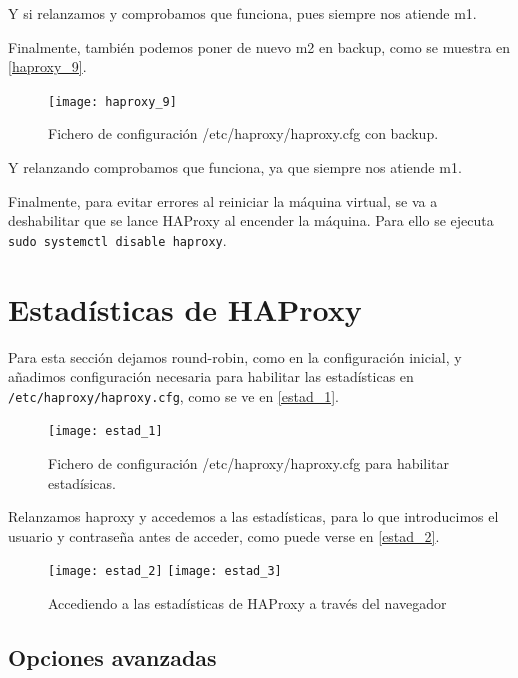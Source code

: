 Y si relanzamos y comprobamos que funciona, pues siempre nos atiende m1.

Finalmente, también podemos poner de nuevo m2 en backup, como se muestra en \eqref{haproxy_9}.

\begin{figure}[h!]
\begin{center}
\caption{Fichero de configuración /etc/haproxy/haproxy.cfg con backup.}
\label{haproxy_9}
\texttt{[image: haproxy\_9]}
\end{center}
\end{figure}

Y relanzando comprobamos que funciona, ya que siempre nos atiende m1.

Finalmente, para evitar errores al reiniciar la máquina virtual, se va a deshabilitar que se lance HAProxy al encender la máquina. Para ello se ejecuta \verb|sudo systemctl disable haproxy|.

\chapter{Estadísticas de HAProxy}

Para esta sección dejamos round-robin, como en la configuración inicial, y añadimos configuración necesaria para habilitar las estadísticas en \verb|/etc/haproxy/haproxy.cfg|, como se ve en \eqref{estad_1}.

\begin{figure}[h!]
\begin{center}
\caption{Fichero de configuración /etc/haproxy/haproxy.cfg para habilitar estadísicas.}
\label{estad_1}
\texttt{[image: estad\_1]}
\end{center}
\end{figure}

Relanzamos haproxy y accedemos a las estadísticas, para lo que introducimos el usuario y contraseña antes de acceder, como puede verse en \eqref{estad_2}.

\begin{figure}[h!]
\begin{center}
\caption{Accediendo a las estadísticas de HAProxy a través del navegador}
\label{estad_2}
\texttt{[image: estad\_2]}
\texttt{[image: estad\_3]}
\end{center}
\end{figure}

\section{Opciones avanzadas}

